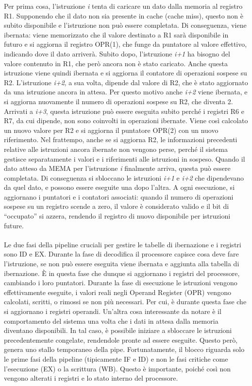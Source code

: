 Per prima cosa, l'istruzione \textit{i} tenta di caricare un dato dalla memoria al registro R1. Supponendo che il dato non sia presente in cache (cache miss), questo non è subito disponibile e l'istruzione non può essere completata. Di conseguenza, viene ibernata: viene memorizzato che il valore destinato a R1 sarà disponibile in futuro e si aggiorna il registro OPR(1), che funge da puntatore al valore effettivo, indicando dove il dato arriverà. Subito dopo, l'istruzione \textit{i+1} ha bisogno del valore contenuto in R1, che però ancora non è stato caricato. Anche questa istruzione viene quindi ibernata e si aggiorna il contatore di operazioni sospese su R2. L’istruzione \textit{i+2}, a sua volta, dipende dal valore di R2, che è stato aggiornato da una istruzione ancora in attesa. Per questo motivo anche \textit{i+2} viene ibernata, e si aggiorna nuovamente il numero di operazioni sospese su R2, che diventa 2. Arrivati a \textit{i+3}, questa istruzione può essere eseguita subito perché i registri R6 e R7, da cui dipende, non sono coinvolti in operazioni ibernate. Viene così calcolato un nuovo valore per R2 e si aggiorna il puntatore OPR(2) con un nuovo riferimento. Nel frattempo, anche se si aggiorna R2, le informazioni precedenti relative alle istruzioni ancora ibernate non vengono perse, perché il sistema gestisce separatamente i valori e i riferimenti alle istruzioni in sospeso. Quando il dato atteso da MEMA per l'istruzione \textit{i} finalmente arriva, questa può essere completata. Di conseguenza si sbloccano le istruzioni \textit{i+1} e \textit{i+2} che dipendevano da quel dato, e possono essere eseguite una dopo l'altra. A ogni esecuzione, si aggiornano i puntatori e i contatori associati: quando il numero di operazioni sospese su un registro scende a zero, il valore è considerato valido e il bit di “occupato” si azzera, rendendo il registro di nuovo disponibile per istruzioni future.
\\
\\
 Le due fasi della pipeline cruciali per gestire le tabelle di ibernazione e i registri sono ID e EX. Durante la fase di decodifica il processore capisce cosa deve fare l'istruzione, se non può essere eseguita viene ibernata e aggiunta alla tabella di ibernazione. \MakeUppercase{è} in questa fase che dunque si aggiornano i registri del processore, cambiando i loro puntatori. Durante la fase di esecuzione le istruzioni vengono effettivamente eseguite, i valori reali negli Operand Register (OPR) vengono calcolati, scritti, o rimossi se non più necessari. Per cui, è durante questa fase che si aggiornano i registri operandi. Un'altra cosa interessante da notare è il comportamento del sistema una volta che i dati in attesa dalla memoria diventano disponibili. In tal caso, è possibile iniziare a sbloccare le istruzioni precedentemente congelate, rendendole pronte ad essere eseguite. Questo però, genera uno stallo temporaneo della pipe. Fortunatamente, il blocco riguarda solo le prime fasi della pipeline (tipicamente IF e ID) e non le fasi critiche come l'esecuzione (EX) o la scrittura (WB). Questo è importante, poiché così non vengono alterati i registri e lo stato interno del processore. 
 
